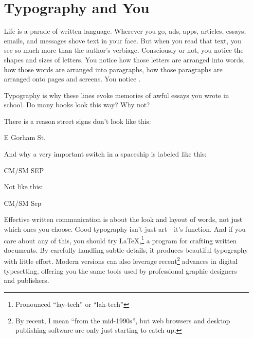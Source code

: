\chapter{Typography and You}
\label{typography}

Life is a parade of written language.
Wherever you go,
ads, apps, articles, essays, emails, and messages
shove text in your face.
But when you read that text, you see so much more than the author's
verbiage.
Consciously or not, you notice the shapes and sizes of letters.
You notice how those letters are arranged into words,
how those words are arranged into paragraphs,
how those paragraphs are arranged onto pages and screens.
You notice .
\begin{leftfigure}
\fontsize{12bp}{24bp}\selectfont\raggedright
Typography is why these lines evoke memories of awful essays
you wrote in school.
Do many books look this way? Why not?
\end{leftfigure}
\medskip
\noindent There is a reason street signs don't look like this:
\begin{leftfigure}
\Large E Gorham St.
\end{leftfigure}
And why a very important switch in a spaceship is labeled like this:
\begin{leftfigure}
CM/SM SEP
\end{leftfigure}
Not like this:
\begin{leftfigure}
\Large CM/SM Sep
\end{leftfigure}

Effective written communication is about the look and layout of words,
not just which ones you choose.
Good typography isn't just art---it's function.
And if you care about any of this,
you should try \LaTeX,\punckern\footnote{Pronounced ``lay-tech''
or ``lah-tech''}
a program for crafting written documents.
By carefully handling subtle details,
it produces beautiful typography with little effort.
Modern versions can also leverage recent\footnote{By recent,
I mean ``from the mid-1990s''\quotekern, but web browsers and desktop publishing
software are only just starting to catch up.} advances in digital typesetting,
offering you the same tools used by professional graphic designers and
publishers.

